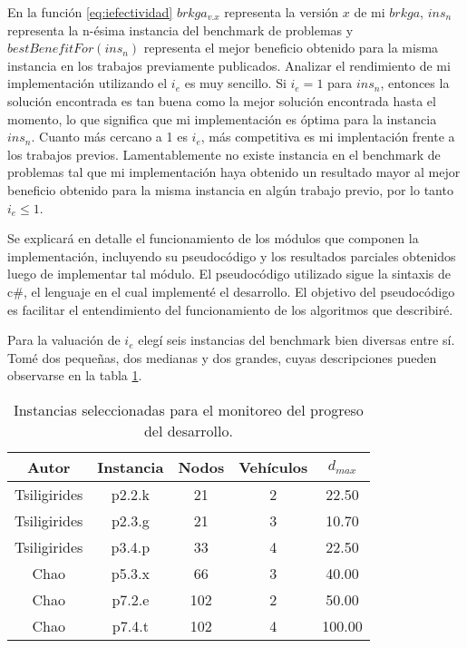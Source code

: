 En la función \eqref{eq:iefectividad} $brkga_{v.x}$ representa la versión $x$ de mi $brkga$, $ins_n$ representa la n-ésima instancia del benchmark de problemas y $bestBenefitFor(ins_n)$ representa el mejor beneficio obtenido para la misma instancia en los trabajos previamente publicados. Analizar el rendimiento de mi implementación utilizando el $i_e$ es muy sencillo. Si $i_e = 1$ para $ins_n$, entonces la solución encontrada es tan buena como la mejor solución encontrada hasta el momento, lo que significa que mi implementación es óptima para la instancia $ins_n$. Cuanto más cercano a 1 es $i_e$, más competitiva es mi implentación frente a los trabajos previos. Lamentablemente no existe instancia en el benchmark de problemas tal que mi implementación haya obtenido un resultado mayor al mejor beneficio obtenido para la misma instancia en algún trabajo previo, por lo tanto $i_e \leq 1$.

\bigskip

Se explicará en detalle el funcionamiento de los módulos que componen la implementación, incluyendo su pseudocódigo y los resultados parciales obtenidos luego de implementar tal módulo. El pseudocódigo utilizado sigue la sintaxis de c\#, el lenguaje en el cual implementé el desarrollo. El objetivo del pseudocódigo es facilitar el entendimiento del funcionamiento de los algoritmos que describiré.


\bigskip

Para la valuación de $i_e$ elegí seis instancias del benchmark bien diversas entre sí. Tomé dos pequeñas, dos medianas y dos grandes, cuyas descripciones pueden observarse en la tabla \ref{tab:instanciasDiversas}.

\begin{table}
\begin{center}
\begin{tabular}
{ |c|c|c|c|c| } 
\hline
Autor & Instancia & Nodos & Vehículos & $d_{max}$ \\
\hline
Tsiligirides & p2.2.k & 21 & 2 & 22.50 \\
Tsiligirides & p2.3.g & 21 & 3 & 10.70 \\
Tsiligirides & p3.4.p & 33 & 4 & 22.50 \\
Chao & p5.3.x & 66 & 3 & 40.00 \\
Chao & p7.2.e & 102 & 2 & 50.00 \\
Chao & p7.4.t & 102 & 4 & 100.00 \\
\hline
\end{tabular}
\end{center}
\caption{Instancias seleccionadas para el monitoreo del progreso del desarrollo.}
\label{tab:instanciasDiversas}
\end{table}



